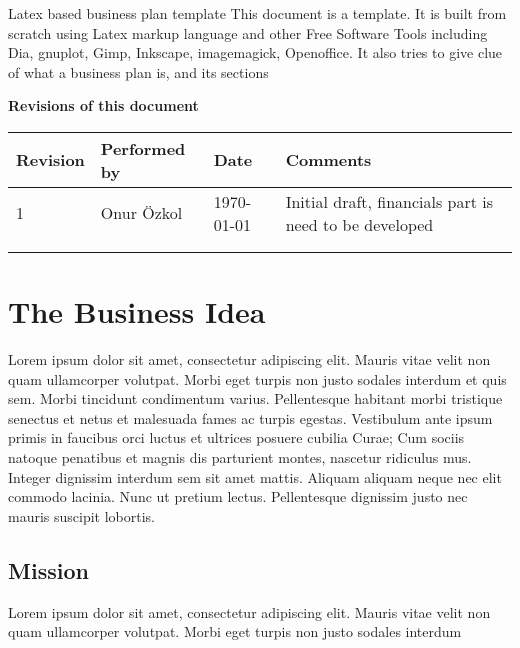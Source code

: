 \documentclass[11pt]{article}
\begin{document}
\begin{center}\huge{Latex based business plan template}\newline
\newline
\newline
\newline
\normalsize
This document is a template. It is built from scratch using Latex 
markup language and other Free Software Tools including Dia, gnuplot, Gimp, 
Inkscape, imagemagick, Openoffice.\newline
It also tries to give clue of what a business plan is, and its sections\newline
\end{center}
\thispagestyle{empty}
\newpage
\tableofcontents
\newpage
\thispagestyle{empty}
\textbf{Revisions of this document}\newline\newline\newline
\begin{tabular}{ | l | l | l | l |}\hline
  Revision & Performed by & Date & Comments \\ \hline
  1 & Onur \"Ozkol & \today & Initial draft, financials part is need to be developed\\ \hline
  & & &  \\ \hline
  & & &  \\ \hline
\end{tabular}

\section{The Business Idea}

Lorem ipsum dolor sit amet, consectetur adipiscing elit. Mauris vitae velit 
non quam ullamcorper volutpat. Morbi eget turpis non justo sodales interdum 
et quis sem. Morbi tincidunt condimentum varius. Pellentesque habitant morbi 
tristique senectus et netus et malesuada fames ac turpis egestas. Vestibulum 
ante ipsum primis in faucibus orci luctus et ultrices posuere cubilia Curae;
Cum sociis natoque penatibus et magnis dis parturient montes, nascetur 
ridiculus mus. Integer dignissim interdum sem sit amet mattis. 
Aliquam aliquam neque nec elit commodo lacinia. Nunc ut pretium lectus. 
Pellentesque dignissim justo nec mauris suscipit lobortis.\newline


\subsection{Mission}
Lorem ipsum dolor sit amet, consectetur adipiscing elit. Mauris vitae velit 
non quam ullamcorper volutpat. Morbi eget turpis non justo sodales interdum
\newline
\end{document}

